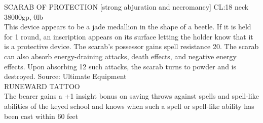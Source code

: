 {SCARAB OF PROTECTION [strong abjuration and necromancy] CL:18 neck 38000gp, 0lb\\
This device appears to be a jade medallion in the shape of a beetle. If it is held for 1 round, an inscription appears on its surface letting the holder know that it is a protective device.   The scarab's possessor gains spell resistance 20. The scarab can also absorb energy-draining attacks, death effects, and negative energy effects. Upon
absorbing 12 such attacks, the scarab turns to powder and is destroyed. Source: Ultimate Equipment\\

RUNEWARD TATTOO \\
The bearer gains a +1 insight bonus on saving throws against spells and spell-like abilities of the keyed school and knows when such a spell or spell-like ability has been cast within 60 feet \\

}

\newcommand{\people}{
}

\newcommand{\scenariolist}{

}


\newcommand{\biography}{

}

